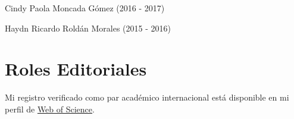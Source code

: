 \documentclass[11pt,a4paper,]{awesome-cv}
\begin{document}
\begin{cventries}
{\begin{cvitems}
\item Cindy Paola Moncada Gómez (2016 - 2017)
\item Haydn Ricardo Roldán Morales (2015 - 2016)
\end{cvitems}}
\end{cventries}

\hypertarget{roles-editoriales}{%
\section{Roles Editoriales}\label{roles-editoriales}}

Mi registro verificado como par académico internacional está disponible
en mi perfil de
\href{https://www.webofscience.com/wos/author/record/387716}{Web of
Science}.
\end{document}
